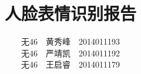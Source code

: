\documentclass[UTF8]{ctexart}
\begin{document}
\title{人脸表情识别报告}
\author{无46\ \ 黄秀峰\ \ 2014011193\\ 无46\ \ 严靖凯\ \ 2014011192\\ 无46\ \ 王启睿\ \ 2014011179}
\maketitle





\end{document}
